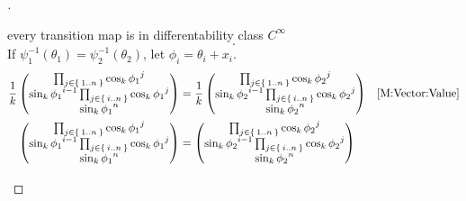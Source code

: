 \documentclass[stu, babel, american, biblatex, a4paper, leqno, draftall]{apa7}
\begin{document}
\begin{proof}[]
\begin{subproof}{every transition map is in differentability class $C^\infty$}
\begin{equation*}
            \text{.}
        \end{equation*}
        If $\psi_1^{-1}\left(\theta_1\right)=\psi_2^{-1}\left(\theta_2\right)$,
        let $\phi_i = \theta_i+x_i$.
        \begin{align*}
            \frac{1}{k}
            \begin{pmatrix}
                \prod_{j\in\Set{1..n}}{\cos_k{\tensor{{\phi_1}}{^j}}}                                \\
                \sin_k{\tensor{{\phi_1}}{^{i-1}}}\prod_{j\in\Set{i..n}}{\cos_k{\tensor{{\phi_1}}{^j}}} \\
                \sin_k{{\tensor{{\phi_1}}{^n}}}                                                      \\
            \end{pmatrix}
            &=
            \frac{1}{k}
            \begin{pmatrix}
                \prod_{j\in\Set{1..n}}{\cos_k{\tensor{{\phi_2}}{^j}}}                                \\
                \sin_k{\tensor{{\phi_2}}{^{i-1}}}\prod_{j\in\Set{i..n}}{\cos_k{\tensor{{\phi_2}}{^j}}} \\
                \sin_k{{\tensor{{\phi_2}}{^n}}}                                                      \\
            \end{pmatrix} & \text{\cref{M:Vector:Value}}\\
            \begin{pmatrix}
                \prod_{j\in\Set{1..n}}{\cos_k{\tensor{{\phi_1}}{^j}}}                                \\
                \sin_k{\tensor{{\phi_1}}{^{i-1}}}\prod_{j\in\Set{i..n}}{\cos_k{\tensor{{\phi_1}}{^j}}} \\
                \sin_k{{\tensor{{\phi_1}}{^n}}}                                                      \\
            \end{pmatrix}
            &=
            \begin{pmatrix}
                \prod_{j\in\Set{1..n}}{\cos_k{\tensor{{\phi_2}}{^j}}}                                \\
                \sin_k{\tensor{{\phi_2}}{^{i-1}}}\prod_{j\in\Set{i..n}}{\cos_k{\tensor{{\phi_2}}{^j}}} \\
                \sin_k{{\tensor{{\phi_2}}{^n}}}                                                      \\
            \end{pmatrix}
        \end{align*}


\end{subproof}
\end{proof}
\end{document}
